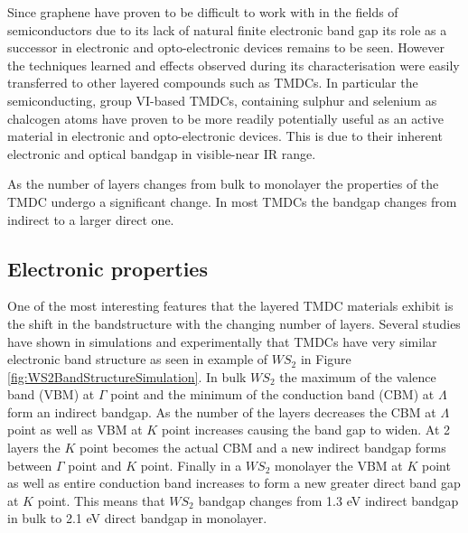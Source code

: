 \documentclass[12pt]{article}
\begin{document}
	Since graphene have proven to be difficult to work with in the fields of semiconductors due to its lack of natural finite electronic band gap its role as a successor in electronic and opto-electronic devices remains to be seen. However the techniques learned and effects observed during its characterisation were easily transferred to other layered compounds such as TMDCs. In particular the semiconducting, group VI-based TMDCs, containing sulphur and selenium as chalcogen atoms have proven to be more readily potentially useful as an active material in electronic and opto-electronic devices. This is due to their inherent electronic and optical bandgap in visible-near IR range. 
	
	As the number of layers changes from bulk to monolayer the properties of the TMDC undergo a significant change. In most TMDCs the bandgap changes from indirect to a larger direct one. 
	
	\subsection{Electronic properties}
	\label{subsec:Electronic properties}
	
	One of the most interesting features that the layered TMDC materials exhibit is the shift in the bandstructure with the changing number of layers. Several studies have shown in simulations and experimentally that TMDCs have very similar electronic band structure as seen in example of $WS_2$ in Figure \ref{fig:WS2BandStructureSimulation}. In bulk $WS_2$ the maximum of the valence band (VBM) at $\Gamma$ point and the minimum of the conduction band (CBM) at $\Lambda$ form an indirect bandgap. As the number of the layers decreases the CBM at $\Lambda$ point as well as VBM at $K$ point increases causing the band gap to widen. At 2 layers the $K$ point becomes the actual CBM and a new indirect bandgap forms between $\Gamma$ point and $K$ point. Finally in a $WS_2$ monolayer the VBM at $K$ point as well as entire conduction band increases to form a new greater direct band gap at $K$ point. This means that $WS_2$ bandgap changes from 1.3 eV indirect bandgap in bulk to 2.1 eV direct bandgap in monolayer.
	
\end{document}
